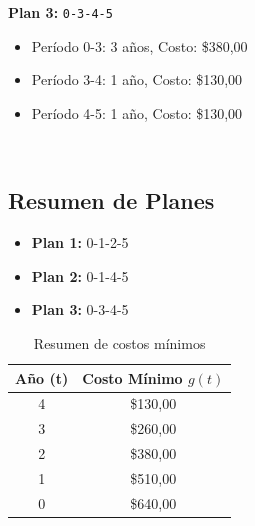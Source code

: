 \documentclass[12pt]{article}
\begin{document}
\textbf{Plan 3:} \texttt{0-3-4-5}\\
\begin{itemize}\small
\item Período 0-3: 3 años, Costo: \$380,00
\item Período 3-4: 1 año, Costo: \$130,00
\item Período 4-5: 1 año, Costo: \$130,00
\end{itemize}
\\
\subsection*{Resumen de Planes}
\begin{itemize}
\item \textbf{Plan 1:} 0-1-2-5
\item \textbf{Plan 2:} 0-1-4-5
\item \textbf{Plan 3:} 0-3-4-5
\end{itemize}
\begin{table}[H]
\centering
\caption{Resumen de costos mínimos}
\begin{tabular}{cc}
\toprule
Año (t) & Costo Mínimo $g(t)$ \\
\midrule
4 & \$130,00 \\
3 & \$260,00 \\
2 & \$380,00 \\
1 & \$510,00 \\
0 & \$640,00 \\
\bottomrule
\end{tabular}
\end{table}
\end{document}
